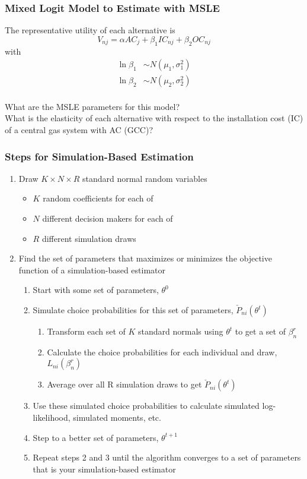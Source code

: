\documentclass{beamer}\usepackage[]{graphicx}\usepackage[]{color}
\begin{document}
\begin{frame}\frametitle{Mixed Logit Model to Estimate with MSLE}
    The representative utility of each alternative is
    $$V_{nj} = \alpha AC_j + \beta_1 IC_{nj} + \beta_2 OC_{nj}$$
    with
    \begin{align*}
    	\ln \beta_1 &\sim N(\mu_1, \sigma_1^2) \\
    	\ln \beta_2 &\sim N(\mu_2, \sigma_2^2)
    \end{align*} \\
    \vspace{2ex}
    What are the MSLE parameters for this model? \\
    \vspace{2ex}
    What is the elasticity of each alternative with respect to the installation cost (IC) of a central gas system with AC (GCC)?
\end{frame}

\begin{frame}\frametitle{Steps for Simulation-Based Estimation}
    \begin{enumerate}
        \item Draw $K \times N \times R$ standard normal random variables
        \begin{itemize}
            \item $K$ random coefficients for each of
            \item $N$ different decision makers for each of
            \item $R$ different simulation draws
        \end{itemize}
        \item Find the set of parameters that maximizes or minimizes the objective function of a simulation-based estimator
        \begin{enumerate}
            \item Start with some set of parameters, $\theta^0$
            \item Simulate choice probabilities for this set of parameters, $\check{P}_{ni}(\theta^t)$
            \begin{enumerate}
                \item Transform each set of $K$ standard normals using $\theta^t$ to get a set of $\beta_n^r$
                \item Calculate the choice probabilities for each individual and draw, $L_{ni}(\beta_n^r)$
                \item Average over all R simulation draws to get $\check{P}_{ni}(\theta^t)$
            \end{enumerate}
            \item Use these simulated choice probabilities to calculate simulated log-likelihood, simulated moments, etc.
            \item Step to a better set of parameters, $\theta^{t + 1}$
            \item Repeat steps 2 and 3 until the algorithm converges to a set of parameters that is your simulation-based estimator
        \end{enumerate}
    \end{enumerate}
\end{frame}
\end{document}
